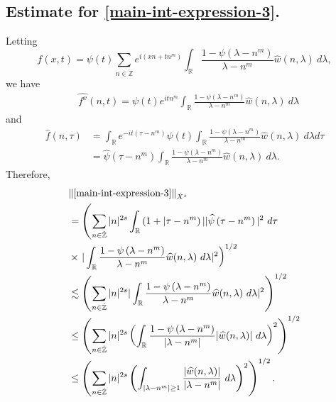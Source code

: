 \documentclass[12pt,reqno]{amsart}
\numberwithin{equation}{section}  %
\numberwithin{figure}{section}
\newcommand{\rr}{\mathbb{R}}
\newcommand{\zz}{\mathbb{Z}}
\newcommand{\zzdot}{\dot{\zz}}
\newcommand{\wh}{\widehat}
\theoremstyle{plain}
\theoremstyle{definition}
\theoremstyle{remark}
\begin{document}
\subsection{Estimate for \eqref{main-int-expression-3}.}
Letting $$f(x,t) = \psi(t) \sum_{n \in \zzdot} e^{i\left( xn + tn^{m} \right)} 
\int_\rr \frac{1 - \psi\left( \lambda - n^{m} \right)}{\lambda - n^{m}} 
\wh{w} \left( n, \lambda \right) \ d \lambda,$$ we have
%
%
\begin{equation*}
	\begin{split}
		& \wh{f^x}(n, t) = \psi(t) e^{itn^{m}} \int_\rr
		\frac{1 - \psi\left( \lambda - n^{m} \right)}{\lambda - n^{m}} 
		\wh{w}(n, \lambda) \ d \lambda
	\end{split}
\end{equation*}
and
\begin{equation*}
	\begin{split}
		 \wh{f}\left( n, \tau \right)
		 & = \int_\rr e^{-it\left( \tau - n^{m} 
		\right)} \psi(t) \int_\rr \frac{1 - \psi\left( 
		\lambda - n^{m} 
		\right)}{\lambda - n^{m}} \wh{w}(n, \lambda) \ d \lambda d \tau
		\\
		& = \wh{\psi}\left( \tau - n^{m} \right) \int_\rr 
		\frac{1 - \psi\left( 
		\lambda - n^{m} 
		\right)}{\lambda - n^{m}} \wh{w}(n, \lambda) \ d \lambda.
	\end{split}
\end{equation*}
Therefore,
%
%
\begin{equation*}
	\begin{split}
		& \| \eqref{main-int-expression-3} \|_{\dot{X}^s} 
		\\
		& = \left( \sum_{n \in \zzdot} |n|^{2s} \int_\rr \left( 1 + | \tau - n^{m
		} \right ) | | \wh{\psi}\left( \tau - n^{m } \right) |^2 \ d \tau
		\right.
		\\
		& \times \left . |
		\int_\rr \frac{1 - \psi\left( \lambda - n^{m } \right)}{\lambda -
		n^{m }} \wh{w}(n, \lambda) \ d \lambda |^2  \right)^{1/2}
		\\
		& \lesssim \left( \sum_{n \in \zzdot} |n|^{2s} | \int_\rr
		\frac{1 - \psi\left( \lambda - n^{m } \right)}{\lambda - n^{m }}
		\wh{w}(n, \lambda) \ d\lambda |^2 \right)^{1/2}
		\\
		& \le \left( \sum_{n \in \zzdot} |n|^{2s}  \left ( \int_\rr
		\frac{1 - \psi\left( \lambda - n^{m } \right)}{|\lambda - n^{m }|}
		|\wh{w}(n, \lambda) | \ d\lambda \right )^2 \right)^{1/2}
		\\
		& \le \left( \sum_{n \in \zzdot} |n|^{2s}  \left ( \int_{| \lambda - 
		n^{m } | \ge 1}
		\frac{|\wh{w}(n, \lambda) | }{|\lambda - n^{m }|}
		\ d\lambda \right )^2 \right)^{1/2}.
	\end{split}
\end{equation*}
\end{document}
